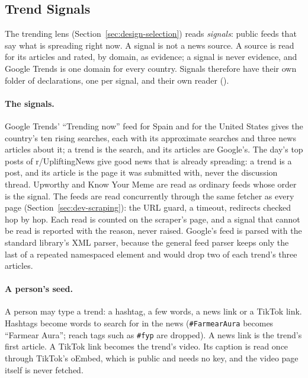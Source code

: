 
\subsection{Trend Signals}
\label{sec:dev-trend-signals}

The trending lens (Section~\ref{sec:design-selection}) reads
\emph{signals}: public feeds that say what is spreading right now. A
signal is not a news source. A source is read for its articles and
rated, by domain, as evidence; a signal is never evidence, and Google
Trends is one domain for every country. Signals therefore have their own
folder of declarations, one per signal, and their own reader
().

\paragraph{The signals.} Google Trends' ``Trending now'' feed for Spain
and for the United States gives the country's ten rising searches, each
with its approximate searches and three news articles about it; a trend
is the search, and its articles are Google's. The day's top posts of
r/UpliftingNews give good news that is already spreading: a trend is a
post, and its article is the page it was submitted with, never the
discussion thread. Upworthy and Know Your Meme are read as ordinary feeds
whose order is the signal. The feeds are read concurrently through the
same fetcher as every page (Section~\ref{sec:dev-scraping}): the URL
guard, a timeout, redirects checked hop by hop. Each read is counted on
the scraper's page, and a signal that cannot be read is reported with
the reason, never raised. Google's feed is parsed with the standard
library's XML parser, because the general feed parser keeps only the
last of a repeated namespaced element and would drop two of each trend's
three articles.

\paragraph{A person's seed.} A person may type a trend: a hashtag, a few
words, a news link or a TikTok link. Hashtags become words to search for
in the news (\texttt{\#FarmearAura} becomes ``Farmear Aura''; reach tags
such as \texttt{\#fyp} are dropped). A news link is the trend's first
article. A TikTok link becomes the trend's video. Its caption is read once
through TikTok's oEmbed, which is public and needs no key, and the video
page itself is never fetched.

